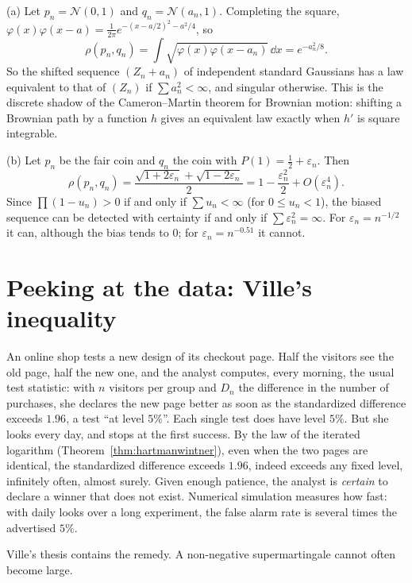 \begin{example}\label{ex:kakutaniex}
(a) Let $p_n=\mathcal N(0,1)$ and $q_n=\mathcal N(a_n,1)$. Completing the square, $\varphi(x)\varphi(x-a)=\frac1{2\pi}e^{-(x-a/2)^2-a^2/4}$, so
\[
\rho(p_n,q_n)=\int\sqrt{\varphi(x)\varphi(x-a_n)}\,\dd x=e^{-a_n^2/8}.
\]
So the shifted sequence $(Z_n+a_n)$ of independent standard Gaussians has a law equivalent to that of $(Z_n)$ if $\sum a_n^2<\infty$, and singular otherwise. This is the discrete shadow of the Cameron--Martin
theorem for Brownian motion: shifting a Brownian path by a function $h$ gives an equivalent law exactly when $h'$ is square integrable.

(b) Let $p_n$ be the fair coin and $q_n$ the coin with $P(1)=\frac12+\varepsilon_n$. Then
\[
\rho(p_n,q_n)=\frac{\sqrt{1+2\varepsilon_n}+\sqrt{1-2\varepsilon_n}}2=1-\frac{\varepsilon_n^2}2+O(\varepsilon_n^4).
\]
Since $\prod(1-u_n)>0$ if and only if $\sum u_n<\infty$ (for $0\le u_n<1$), the biased sequence can be detected with certainty if and only if $\sum\varepsilon_n^2=\infty$. For $\varepsilon_n=n^{-1/2}$ it can, although the bias
tends to $0$; for $\varepsilon_n=n^{-0.51}$ it cannot.
\end{example}

\section{Peeking at the data: Ville's inequality}

An online shop tests a new design of its checkout page. Half the visitors see the old page, half the new one, and the analyst computes, every morning, the usual test statistic: with $n$ visitors per
group and $D_n$ the difference in the number of purchases, she declares the new page better as soon as the standardized difference exceeds $1.96$, a test ``at level $5\%$''. Each single test does have level $5\%$.
But she looks every day, and stops at the first success. By the law of the iterated logarithm (Theorem~\ref{thm:hartmanwintner}), even when the two pages are identical, the standardized difference exceeds
$1.96$, indeed exceeds any fixed level, infinitely often, almost surely. Given enough patience, the analyst is \emph{certain} to declare a winner that does not exist. Numerical simulation measures how fast:
with daily looks over a long experiment, the false alarm rate is several times the advertised $5\%$.

Ville's thesis contains the remedy. A non-negative supermartingale cannot often become large.

